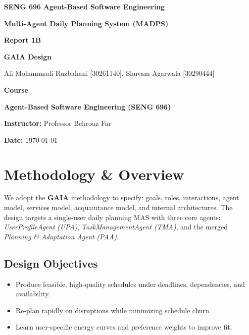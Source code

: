 \documentclass[12pt,oneside]{report}
\begin{document}
\begin{titlepage}
  \centering
  {\Large \textbf{SENG 696  Agent-Based Software Engineering}\par}
  \vspace{1.5cm}
  {\huge \textbf{Multi-Agent Daily Planning System (MADPS)}\par}
  \vspace{1.3cm}
  {\Large \textbf{Report 1B}\par}
  {\Large \textbf{GAIA Design}\par}
  \vspace{1.2cm}
  {\large Ali Mohammadi Ruzbahani [30261140], Shuvam Agarwala [30290444]\par}
  \vspace{1.2cm}
  {\large \textbf{Course} \par}
  {\large \textbf{Agent-Based Software Engineering (SENG 696)} \par}
  \vspace{1.2cm}
  {\large \textbf{Instructor:} Professor Behrouz Far\par}
   \vspace{2.2cm}

  {\large \textbf{Date:} \today\par}
  \vfill

\end{titlepage}



\tableofcontents
\listoffigures
\listoftables
\clearpage

\chapter{Methodology \& Overview}
We adopt the \textbf{GAIA} methodology to specify: goals, roles, interactions, agent model, services model, acquaintance model, and internal architectures. The design targets a single-user daily planning MAS with three core agents: \emph{UserProfileAgent (UPA)}, \emph{TaskManagementAgent (TMA)}, and the merged \emph{Planning \& Adaptation Agent (PAA)}.

\section{Design Objectives}
\begin{itemize}[leftmargin=1.2cm]
  \item Produce feasible, high-quality schedules under deadlines, dependencies, and availability.
  \item Re-plan rapidly on disruptions while minimizing schedule churn.
  \item Learn user-specific energy curves and preference weights to improve fit.
\end{itemize}
\end{document}
